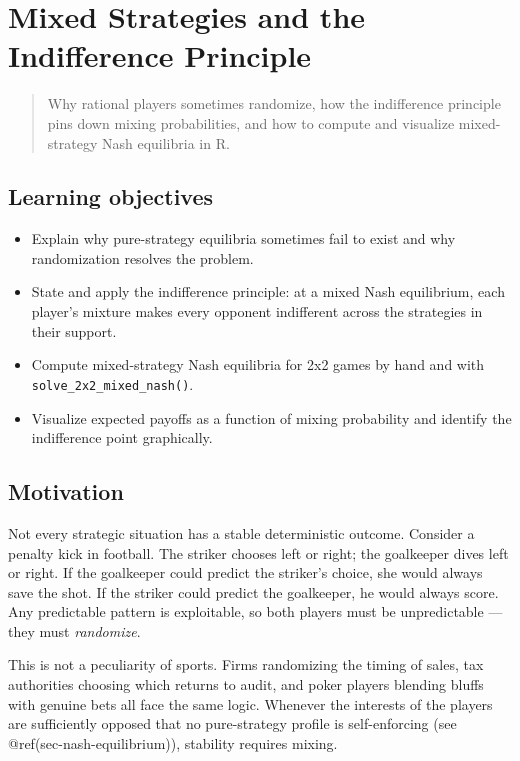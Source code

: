 \documentclass[
]{article}
\author{}
\date{\vspace{-2.5em}}
\providecommand{\tightlist}{%
  \setlength{\itemsep}{0pt}\setlength{\parskip}{0pt}}
\begin{document}
\section{Mixed Strategies and the Indifference
Principle}\label{sec-mixed-strategies}

\begin{quote}
Why rational players sometimes randomize, how the indifference principle
pins down mixing probabilities, and how to compute and visualize
mixed-strategy Nash equilibria in R.
\end{quote}

\subsection*{Learning objectives}\label{learning-objectives}

\begin{itemize}
\tightlist
\item
  Explain why pure-strategy equilibria sometimes fail to exist and why
  randomization resolves the problem.
\item
  State and apply the indifference principle: at a mixed Nash
  equilibrium, each player's mixture makes every opponent indifferent
  across the strategies in their support.
\item
  Compute mixed-strategy Nash equilibria for 2x2 games by hand and with
  \texttt{solve\_2x2\_mixed\_nash()}.
\item
  Visualize expected payoffs as a function of mixing probability and
  identify the indifference point graphically.
\end{itemize}

\subsection{Motivation}\label{motivation}

Not every strategic situation has a stable deterministic outcome.
Consider a penalty kick in football. The striker chooses left or right;
the goalkeeper dives left or right. If the goalkeeper could predict the
striker's choice, she would always save the shot. If the striker could
predict the goalkeeper, he would always score. Any predictable pattern
is exploitable, so both players must be unpredictable --- they must
\emph{randomize}.

This is not a peculiarity of sports. Firms randomizing the timing of
sales, tax authorities choosing which returns to audit, and poker
players blending bluffs with genuine bets all face the same logic.
Whenever the interests of the players are sufficiently opposed that no
pure-strategy profile is self-enforcing (see
@ref(sec-nash-equilibrium)), stability requires mixing.
\end{document}
